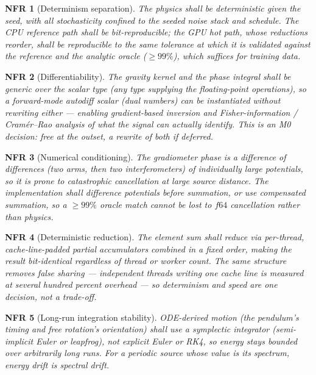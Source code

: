 \documentclass[11pt,a4paper]{article}
\theoremstyle{reqstyle}
\newtheorem{nfreq}{NFR}
\begin{document}
\begin{nfreq}[Determinism separation]
The physics shall be deterministic given the seed, with all stochasticity confined to the
seeded noise stack and schedule. The CPU reference path shall be bit-reproducible; the GPU
hot path, whose reductions reorder, shall be reproducible to the same tolerance at which it is
validated against the reference and the analytic oracle ($\geq 99\%$), which suffices for
training data.
\end{nfreq}

\begin{nfreq}[Differentiability]
\label{nfr:diff}
The gravity kernel and the phase integral shall be generic over the scalar type (any type
supplying the floating-point operations), so a forward-mode autodiff scalar (dual numbers) can
be instantiated without rewriting either --- enabling gradient-based inversion and
Fisher-information / Cram\'er--Rao analysis of what the signal can actually identify. This is
an M0 decision: free at the outset, a rewrite of both if deferred.
\end{nfreq}

\begin{nfreq}[Numerical conditioning]
\label{nfr:cond}
The gradiometer phase is a difference of differences (two arms, then two interferometers) of
individually large potentials, so it is prone to catastrophic cancellation at large source
distance. The implementation shall difference potentials \emph{before} summation, or use
compensated summation, so a $\geq 99\%$ oracle match cannot be lost to $f64$ cancellation
rather than physics.
\end{nfreq}

\begin{nfreq}[Deterministic reduction]
\label{nfr:reduce}
The element sum shall reduce via per-thread, cache-line-padded partial accumulators combined
in a fixed order, making the result bit-identical regardless of thread or worker count. The
same structure removes false sharing --- independent threads writing one cache line is
measured at several hundred percent overhead --- so determinism and speed are one decision,
not a trade-off.
\end{nfreq}

\begin{nfreq}[Long-run integration stability]
\label{nfr:symplectic}
ODE-derived motion (the pendulum's timing and free rotation's orientation) shall use a symplectic
integrator (semi-implicit Euler or
leapfrog), not explicit Euler or RK4, so energy stays bounded over arbitrarily long runs. For
a periodic source whose value is its spectrum, energy drift is spectral drift.
\end{nfreq}
\end{document}

